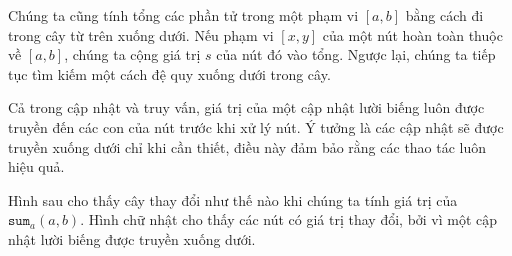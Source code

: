 \begin{center}
\end{center}

Chúng ta cũng tính tổng các phần tử trong một phạm vi $[a,b]$
bằng cách đi trong cây từ trên xuống dưới.
Nếu phạm vi $[x,y]$ của một nút hoàn toàn thuộc về
$[a,b]$, chúng ta cộng giá trị $s$ của nút đó vào tổng.
Ngược lại, chúng ta tiếp tục tìm kiếm một cách đệ quy
xuống dưới trong cây.

Cả trong cập nhật và truy vấn,
giá trị của một cập nhật lười biếng luôn được truyền
đến các con của nút
trước khi xử lý nút.
Ý tưởng là các cập nhật sẽ được truyền
xuống dưới chỉ khi cần thiết,
điều này đảm bảo rằng các thao tác luôn hiệu quả.

Hình sau cho thấy cây thay đổi như thế nào
khi chúng ta tính giá trị của $\texttt{sum}_a(a,b)$.
Hình chữ nhật cho thấy các nút có giá trị thay đổi,
bởi vì một cập nhật lười biếng được truyền xuống dưới.

